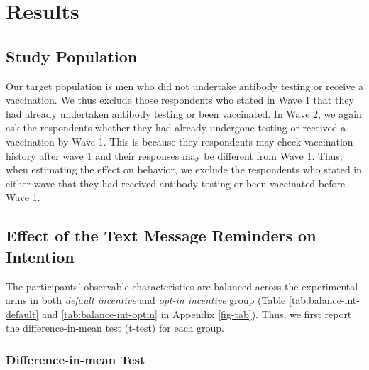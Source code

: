 \documentclass[
]{article}
\begin{document}
\hypertarget{results}{%
\section{Results}\label{results}}

\hypertarget{sample}{%
\subsection{Study Population}\label{sample}}

Our target population is men who did not undertake antibody testing or receive a vaccination. We thus exclude those respondents who stated in Wave 1 that they had already undertaken antibody testing or been vaccinated. In Wave 2, we again ask the respondents whether they had already undergone testing or received a vaccination by Wave 1. This is because they respondents may check vaccination history after wave 1 and their responses may be different from Wave 1. Thus, when estimating the effect on behavior, we exclude the respondents who stated in either wave that they had received antibody testing or been vaccinated before Wave 1.

\hypertarget{intention}{%
\subsection{Effect of the Text Message Reminders on Intention}\label{intention}}

The participants' observable characteristics are balanced across the experimental arms in both \emph{default incentive} and \emph{opt-in incentive} group (Table \ref{tab:balance-int-default} and \ref{tab:balance-int-optin} in Appendix \ref{fig-tab}). Thus, we first report the difference-in-mean test (t-test) for each group.

\hypertarget{difference-in-mean-test}{%
\subsubsection{Difference-in-mean Test}\label{difference-in-mean-test}}
\end{document}
